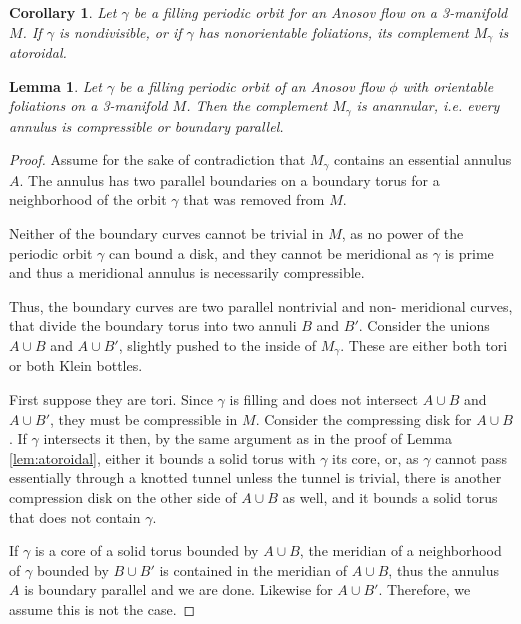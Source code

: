 \documentclass[12pt]{amsart}
\newtheorem{corollary}[theorem]{Corollary}
\newtheorem{lemma}[theorem]{Lemma}
\theoremstyle{definition}
\theoremstyle{remark}
\newcommand{\mg}{M_\gamma}
\begin{document}
\begin{corollary}\label{cor: nonorientable is atoroidal}
    Let $\gamma$ be a filling periodic orbit for an Anosov flow on a 3-manifold $M$. If $\gamma$ is nondivisible, or if $\gamma$ has nonorientable foliations, its complement  $\mg$ is atoroidal.
\end{corollary}


\begin{lemma}\label{lem:anannular}
   Let $\gamma$ be a filling periodic orbit of an Anosov flow $\phi$ with orientable foliations on a 3-manifold $M$. Then the complement $\mg$ is anannular, i.e. every annulus is compressible or boundary parallel.
\end{lemma}

\begin{proof}

Assume for the sake of contradiction that $\mg$ contains an essential annulus $A$. The annulus has two parallel boundaries on a boundary torus for a neighborhood of the orbit $\gamma$ that was removed from $M$. 

Neither of the boundary curves cannot be trivial in $M$, as no power of the periodic orbit $\gamma$ can bound a disk, and they cannot be meridional as $\gamma$ is prime and thus a meridional annulus is necessarily compressible. 

Thus, the boundary curves are two parallel nontrivial and non- meridional curves, that divide the boundary torus into two annuli $B$ and $B'$. 
Consider the unions $A\cup B$ and $A\cup B'$, slightly pushed to the inside of $\mg$. These are either both tori or both Klein bottles. 

First suppose they are tori. Since $\gamma$ is filling and does not intersect $A\cup B$ and $A\cup B'$, they must be compressible in $M$.
Consider the compressing disk for $A\cup B$. If $\gamma$ intersects it then, by the same argument as in the proof of Lemma \ref{lem:atoroidal}, either it bounds a solid torus with $\gamma$ its core, or, as $\gamma$ cannot pass essentially through a knotted tunnel unless the tunnel is trivial, there is another compression disk on the other side of $A\cup B$ as well, and it bounds a solid torus that does not contain $\gamma$. 

If $\gamma$ is a core of a solid torus bounded by $A\cup B$, the meridian of a neighborhood of $\gamma$ bounded by $B\cup B'$ is contained in the meridian of  $A\cup B$, thus the annulus $A$ is boundary parallel and we are done. Likewise for  $A\cup B'$. Therefore, we assume this is not the case.


\end{proof}
\end{document}
